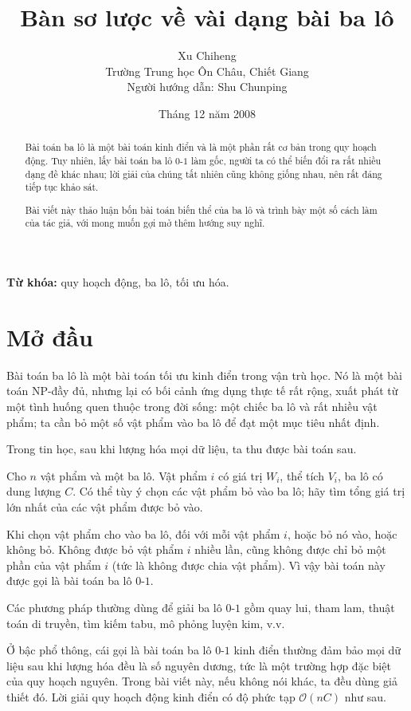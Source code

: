\documentclass[11pt]{article}
\title{Bàn sơ lược về vài dạng bài ba lô}
\author{Xu Chiheng\\Trường Trung học Ôn Châu, Chiết Giang\\Người hướng dẫn: Shu Chunping}
\date{Tháng 12 năm 2008}
\newcommand{\Oh}{\mathcal{O}}
\begin{document}
\maketitle


\begin{abstract}
Bài toán ba lô là một bài toán kinh điển và là một phần rất cơ bản trong quy
hoạch động. Tuy nhiên, lấy bài toán ba lô \(0\)-\(1\) làm gốc, người ta có thể
biến đổi ra rất nhiều dạng đề khác nhau; lời giải của chúng tất nhiên cũng
không giống nhau, nên rất đáng tiếp tục khảo sát.

Bài viết này thảo luận bốn bài toán biến thể của ba lô và trình bày một số
cách làm của tác giả, với mong muốn gợi mở thêm hướng suy nghĩ.
\end{abstract}

\noindent\textbf{Từ khóa:} quy hoạch động, ba lô, tối ưu hóa.

\section{Mở đầu}

Bài toán ba lô là một bài toán tối ưu kinh điển trong vận trù học. Nó là một
bài toán NP-đầy đủ, nhưng lại có bối cảnh ứng dụng thực tế rất rộng, xuất phát
từ một tình huống quen thuộc trong đời sống:
một chiếc ba lô và rất nhiều vật phẩm; ta cần bỏ một số vật phẩm vào ba lô để
đạt một mục tiêu nhất định.

Trong tin học, sau khi lượng hóa mọi dữ liệu, ta thu được bài toán sau.

Cho \(n\) vật phẩm và một ba lô. Vật phẩm \(i\) có giá trị \(W_i\), thể tích
\(V_i\), ba lô có dung lượng \(C\). Có thể tùy ý chọn các vật phẩm bỏ vào ba
lô; hãy tìm tổng giá trị lớn nhất của các vật phẩm được bỏ vào.

Khi chọn vật phẩm cho vào ba lô, đối với mỗi vật phẩm \(i\), hoặc bỏ nó vào,
hoặc không bỏ. Không được bỏ vật phẩm \(i\) nhiều lần, cũng không được chỉ bỏ
một phần của vật phẩm \(i\) (tức là không được chia vật phẩm). Vì vậy bài toán
này được gọi là bài toán ba lô \(0\)-\(1\).

Các phương pháp thường dùng để giải ba lô \(0\)-\(1\) gồm quay lui, tham lam,
thuật toán di truyền, tìm kiếm tabu, mô phỏng luyện kim, v.v.

Ở bậc phổ thông, cái gọi là bài toán ba lô \(0\)-\(1\) kinh điển thường đảm
bảo mọi dữ liệu sau khi lượng hóa đều là số nguyên dương, tức là một trường
hợp đặc biệt của quy hoạch nguyên. Trong bài viết này, nếu không nói khác, ta
đều dùng giả thiết đó. Lời giải quy hoạch động kinh điển có độ phức tạp
\(\Oh(nC)\) như sau.
\end{document}
